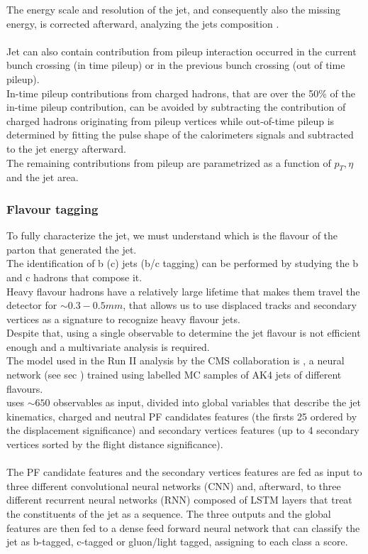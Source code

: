 The energy scale and resolution of the jet, and consequently also the missing energy, is corrected afterward, analyzing the jets composition  \cite{Khachatryan2017JetTeV}.\\
\\
Jet can also contain contribution from pileup interaction occurred in the current bunch crossing (in time pileup) or in the previous bunch crossing (out of time pileup).\\
In-time pileup contributions from charged hadrons, that are over the 50\% of the in-time pileup contribution, can be avoided by subtracting the contribution of charged hadrons originating from pileup vertices while out-of-time pileup is determined by fitting the pulse shape of the calorimeters signals and subtracted to the jet energy afterward.\\
The remaining contributions from pileup are parametrized as a function of $p_T, \eta$ and the jet area.

\subsubsection*{Flavour tagging}
To fully characterize the jet, we must understand which is the flavour of the parton that generated the jet.\\
The identification of b (c) jets (b/c tagging) can be performed by studying the b and c hadrons that compose it.\\
Heavy flavour hadrons have a relatively large lifetime that makes them travel the detector for $\sim 0.3-0.5mm$, that allows us to use displaced tracks and secondary vertices as a signature to recognize heavy flavour jets.\\
Despite that, using a single observable to determine the jet flavour is not efficient enough and a multivariate analysis is required.\\
The model used in the Run II analysis by the CMS collaboration is \DeepJet \cite{Bols2020JetDeepJet}, a neural network (see sec \ADDREF) trained using labelled MC samples of AK4 jets of different flavours.\\
\DeepJet uses $\sim 650$ observables as input, divided into global variables that describe the jet kinematics, charged and neutral PF candidates features (the firsts 25 ordered by the displacement significance) and secondary vertices features (up to 4 secondary vertices sorted by the flight distance significance).\\
\\
The PF candidate features and the secondary vertices features are fed as input to three different convolutional neural networks (CNN) \cite{OShea2015AnNetworks} and, afterward, to three different recurrent neural networks (RNN) composed of LSTM layers \cite{Sherstinsky2018FundamentalsNetwork} that treat the constituents of the jet as a sequence. The three outputs and the global features are then fed to a dense feed forward neural network that can classify the jet as b-tagged, c-tagged or gluon/light tagged, assigning to each class a score.

